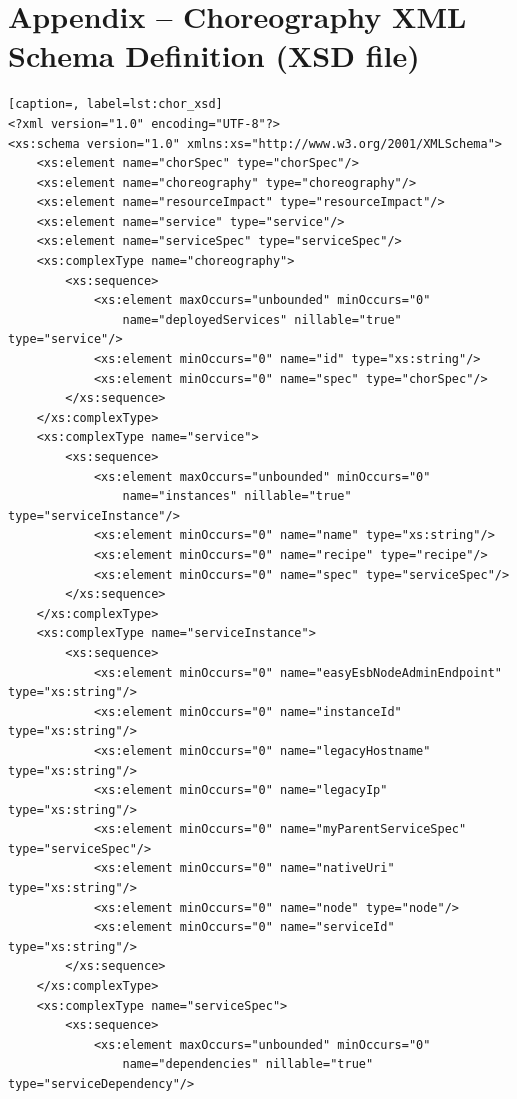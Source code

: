 \documentclass[a4paper, 10pt]{article}
\begin{document}
\section*{Appendix -- Choreography XML Schema Definition (XSD file)}

{\footnotesize

\lstset{language=XML}

\begin{lstlisting}[caption=, label=lst:chor_xsd]
<?xml version="1.0" encoding="UTF-8"?>
<xs:schema version="1.0" xmlns:xs="http://www.w3.org/2001/XMLSchema">
    <xs:element name="chorSpec" type="chorSpec"/>
    <xs:element name="choreography" type="choreography"/>
    <xs:element name="resourceImpact" type="resourceImpact"/>
    <xs:element name="service" type="service"/>
    <xs:element name="serviceSpec" type="serviceSpec"/>
    <xs:complexType name="choreography">
        <xs:sequence>
            <xs:element maxOccurs="unbounded" minOccurs="0"
                name="deployedServices" nillable="true" type="service"/>
            <xs:element minOccurs="0" name="id" type="xs:string"/>
            <xs:element minOccurs="0" name="spec" type="chorSpec"/>
        </xs:sequence>
    </xs:complexType>
    <xs:complexType name="service">
        <xs:sequence>
            <xs:element maxOccurs="unbounded" minOccurs="0"
                name="instances" nillable="true" type="serviceInstance"/>
            <xs:element minOccurs="0" name="name" type="xs:string"/>
            <xs:element minOccurs="0" name="recipe" type="recipe"/>
            <xs:element minOccurs="0" name="spec" type="serviceSpec"/>
        </xs:sequence>
    </xs:complexType>
    <xs:complexType name="serviceInstance">
        <xs:sequence>
            <xs:element minOccurs="0" name="easyEsbNodeAdminEndpoint" type="xs:string"/>
            <xs:element minOccurs="0" name="instanceId" type="xs:string"/>
            <xs:element minOccurs="0" name="legacyHostname" type="xs:string"/>
            <xs:element minOccurs="0" name="legacyIp" type="xs:string"/>
            <xs:element minOccurs="0" name="myParentServiceSpec" type="serviceSpec"/>
            <xs:element minOccurs="0" name="nativeUri" type="xs:string"/>
            <xs:element minOccurs="0" name="node" type="node"/>
            <xs:element minOccurs="0" name="serviceId" type="xs:string"/>
        </xs:sequence>
    </xs:complexType>
    <xs:complexType name="serviceSpec">
        <xs:sequence>
            <xs:element maxOccurs="unbounded" minOccurs="0"
                name="dependencies" nillable="true" type="serviceDependency"/>

\end{lstlisting}}
\end{document}
